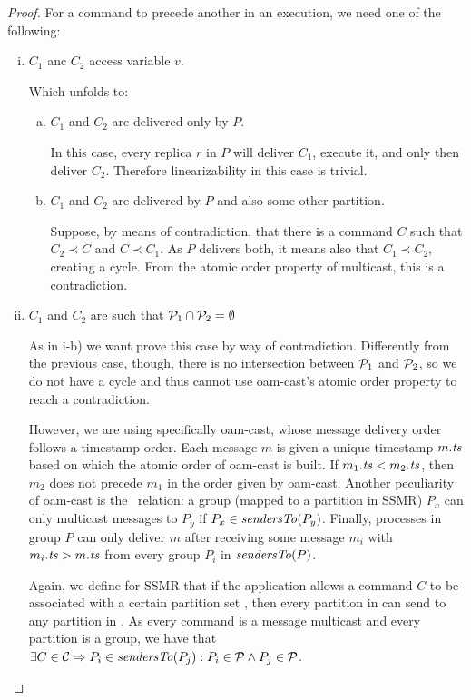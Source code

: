 \documentclass{usiinftr}
\begin{document}
\begin{proof}
For a command to precede another in an execution, we need one of the following:

\begin{enumerate}[i)]

\item $C_1$ anc $C_2$ access variable $v$.

Which unfolds to:

\begin{enumerate}[a)]

\item $C_1$ and $C_2$ are delivered only by $P$.

In this case, every replica $r$ in $P$ will deliver $C_1$, execute it, and only then deliver $C_2$. Therefore linearizability in this case is trivial.

\item $C_1$ and $C_2$ are delivered by $P$ and also some other partition.

Suppose, by means of contradiction, that there is a command $C$ such that $C_2 \prec C$ and $C \prec C_1$. As $P$ delivers both, it means also that $C_1 \prec C_2$, creating a cycle. From the atomic order property of multicast, this is a contradiction.

\end{enumerate}

\item $C_1$ and $C_2$ are such that $\mathcal{P}_1 \cap \mathcal{P}_2 = \emptyset$

As in i-b) we want prove this case by way of contradiction. Differently from the previous case, though, there is no intersection between $\mathcal{P}_1$ and $\mathcal{P}_2$, so we do not have a cycle and thus cannot use oam-cast's atomic order property to reach a contradiction.

However, we are using specifically oam-cast, whose message delivery order follows a timestamp order. Each message $m$ is given a unique timestamp $m.\text{\textit{ts}}$ based on which the atomic order of oam-cast is built. If $m_1.\text{\textit{ts}} < m_2.\text{\textit{ts}}$, then $m_2$ does not precede $m_1$ in the order given by oam-cast. Another peculiarity of oam-cast is the \sendersTo\ relation: a group (mapped to a partition in SSMR) $P_x$ can only multicast messages to $P_y$ if $P_x \in \text{\textit{sendersTo}}(P_y)$. Finally, processes in group $P$ can only deliver $m$ after receiving some message $m_i$ with $m_i.\text{\textit{ts}} > m.\text{\textit{ts}}$ from every group $P_i$ in $\text{\textit{sendersTo}}(P)$.

Again, we define for SSMR that if the application allows a command $C$ to be associated with a certain partition set \pp, then every partition in \pp can send to any partition in \pp. As every command is a message multicast and every partition is a group, we have that $\exists C \in \mathcal{C} \Rightarrow P_i \in \text{\textit{sendersTo}}(P_j) : P_i \in \mathcal{P} \wedge P_j \in \mathcal{P}$.


\end{enumerate}
\end{proof}
\end{document}
